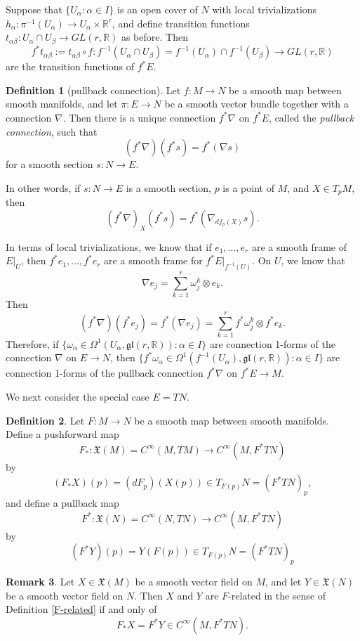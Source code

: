 \documentclass{amsart}
\numberwithin{equation}{section}
\newcommand{\bR}{\mathbb{R}}
\newcommand{\fgl}{\mathfrak{gl}}
\newcommand{\fX}{\mathfrak{X}}
\theoremstyle{definition}
\newtheorem{definition}{Definition} [section]
\newtheorem{remark}[definition]{Remark}
\theoremstyle{theorem}
\begin{document}
Suppose that $\{U_\alpha:\alpha\in I\}$ is an open cover of $N$ with local trivializations 
$h_\alpha: \pi^{-1}(U_\alpha)\to U_\alpha\times \bR^r$, and define transition functions
$t_{\alpha\beta}:U_\alpha\cap U_\beta \to GL(r,\bR)$ as before. Then
$$
f^*t_{\alpha\beta}:= t_{\alpha\beta}\circ f :f^{-1}(U_\alpha\cap U_\beta) =f^{-1}(U_\alpha)\cap f^{-1}(U_\beta) \to GL(r,\bR)
$$ 
are the transition functions of $f^*E$. 


\begin{definition}[pullback connection]
Let $f : M \to N$ be a smooth map between smooth manifolds, and let $\pi : E \to N$ 
be a smooth vector bundle together with a connection $\nabla$. Then there is a unique connection 
$f^*\nabla$ on $f^*E$, called the {\em pullback connection}, such that 
\[
(f^*\nabla)(f^*s) = f^*(\nabla s)
\]
for a smooth section $s : N \to E$. 
\end{definition}

In other words, if $s : N \to E$ is a smooth section, $p$ is a point of $M$, and $X \in T_pM$, then 
\[
(f^*\nabla)_X(f^*s) = f^*(\nabla_{df_p(X)}s). 
\]

In terms of local trivializations, we know that if $e_1, \ldots, e_r$ are a smooth frame of $E|_U$, then $f^*e_1, \ldots, f^*e_r$ are 
a smooth frame for $f^*E|_{f^{-1}(U)}$. On $U$, we know that 
\[
\nabla e_j = \sum_{k=1}^r \omega_j^k \otimes e_k.
\]
Then 
\[
(f^*\nabla)(f^*e_j) = f^*(\nabla e_j) = \sum_{k=1}^r f^* \omega_j^k \otimes f^*e_k.
\]
Therefore, if $\{\omega_\alpha\in \Omega^1(U_\alpha,\fgl(r,\bR)):\alpha\in I\}$ are connection 1-forms
of the connection $\nabla$ on $E\to N$, then 
 $\{f^*\omega_\alpha\in \Omega^1(f^{-1}(U_\alpha),\fgl(r,\bR)):\alpha\in I\}$ are connection 1-forms
of the pullback connection $f^*\nabla$ on $f^*E\to M$.


We next consider the special case $E=TN$.
\begin{definition}
Let $F : M \to N$ be a smooth map between smooth manifolds. Define a
pushforward map 
$$ 
F_* : \fX(M)=C^\infty(M,TM) \to C^\infty(M, F^*TN)
$$
by 
\[
(F_*X)(p) = (dF_p)(X(p)) \in T_{F(p)}N = (F^*TN)_p,
\]
and define a pullback map
$$
F^* : \fX(N)=C^\infty(N,TN) \to C^\infty(M, F^*TN)
$$ 
by 
\[
(F^*Y)(p) = Y(F(p)) \in T_{F(p)}N = (F^*TN)_p
\]
\end{definition}

\begin{remark}
Let $X\in \fX(M)$ be a smooth vector field on $M$, and let
$Y\in \fX(N)$ be a smooth vector field on $N$. Then $X$ and $Y$ are $F$-related
in the sense of Definition \ref{F-related} if and only of
$$
F_* X = F^*Y \in C^\infty(M, F^*TN). 
$$
\end{remark}
\end{document}

